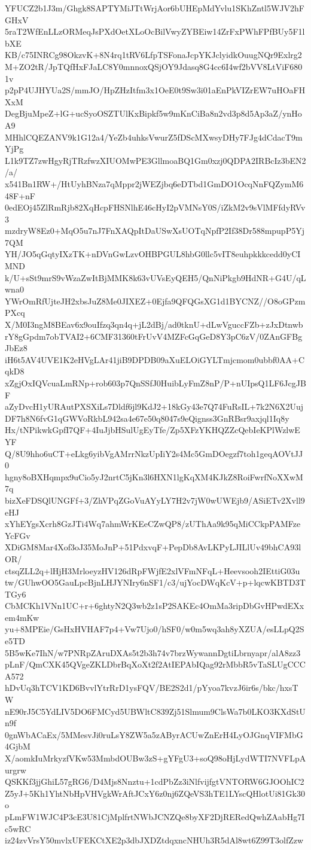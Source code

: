 YFUCZ2b1J3m/Ghgk8SAPTYMiJTtWrjAor6bUHEpMdYvlu1SKhZntl5WJV2hFGHxV
5raT2WfEnLLzORMeqJsPXdOetXLoOcBilVwyZYBEiw14ZrFxPWhFPfBUy5F1lbXE
KB/c75INRCg98OkzvK+8N4rq1tRV6LfpTSFonaJcpYKJclyidkOuugNQr9Exlrg2
M+ZO2tR/JpTQfHxFJaLC8Y0mnnoxQSjOY9Jdasq8G4cc6I4wf2bVV8LtViF6801v
p2pP4UJHYUa2S/mmJO/HpZHzItfm3x1OeE0t9Sw3i01aEnPkVIZrEW7uHOaFHXxM
DegBjuMpeZ+lG+ucSyoOSZTUlKxBipkf5w9mKnCiBa8n2vd3p8d5Ap3aZ/ynHoA9
MHhlCQEZANV9k1G12a4/YeZb4uhksVwurZ5fDScMXwsyDHy7FJg4dCdacT9mYjPg
L1k9TZ7zwHgyRjTRzfwzXIUOMwPE3GllmoaBQ1Gm0xzj0QDPA2IRBcIz3bEN2/a/
x541Bn1RW+/HtUyhBNza7qMppr2jWEZjbq6eDTbd1GmDO1OcqNnFQZymM648F+nF
0edEOj45ZlRmRjb82XqHcpFHSNlhE46cHyI2pVMNsY0S/iZkM2v9sVlMFfdyRVv3
mzdryW8Ez0+MqO5u7nJ7FnXAQpItDaUSwXsUOTqNpfP2If38Dr588mpupP5Yj7QM
YH/JO5qGqtyIXzTK+nDVnGwLzvOHBPGUL8hbG0llc5vIT8euhpkkkcedd0yCIMND
k/U+sSt9mrS9vWzaZwItBjMMK8k63vUVsEyQEH5/QnNiPkgb9HdNR+G4U/qLwna0
YWrOmRfUjteJH2xbsJuZ8Me0JIXEZ+0Ejfa9QFQGsXG1d1BYCNZ//O8oGPzmPXcq
X/M0I3ngM8BEav6x9ouIfzq3qn4q+jL2dBj/ad0tknU+dLwVguccFZb+zJxDtnwb
rY8gGpdm7obTVAI2+6CMF31360tFrUvV4MZFcGqGeD8Y3pC6zV/0ZAnGFBgJbEz8
iH6t5AV4UVE1K2eHVgLAr41jiB9DPDB09aXuELOiGYLTmjcmom0ubbf0AA+CqkD8
xZgjOxIQVcuaLmRNp+rob603p7QnSSfJ0HuibLyFmZ8nP/P+nUIpsQ1LF6JcgJBF
aZyDvcH1yURAutPXSXiLs7Dldf6jl9KdJ2+18kGy43e7Q74FuRsIL+7k2N6X2Uuj
DF7h8N6fvG1qGWVoRkbL942sa4e67e50q8047s9eQignss3GnRBsr9axjql1Iq8y
Hx/tNPikwkGpfI7QF+4IuJjbHSulUgEyTfe/Zp5XFzYKHQZZcQebIeKPlWzlwEYF
Q/8U9hho6uCT+eLkg6yibVgAMrrNkzUpIiY2s4Mc5GmDOegzf7toh1geqAOVtJJ0
hgny8oBXHqmpx9uCio5yJ2nrtC5jKn3l6HXN1lgKqXM4KJkZ8RoiFwrfNoXXwM7q
bizXeFDSQlUNGFf+3/ZhVPqZGoVuAYyLY7H2v7jW0wUWEjb9/ASiETv2Xvll9eHJ
xYhEYgsXcrh8GzJTi4Wq7ahmWrKEeCZwQP8/zUThAa9k95qMiCCkpPAMFzeYcFGv
XDiGM8Mar4Xof3oJ35MoJnP+51PdxvqF+PepDb8AvLKPyLJILlUv49bhCA93lOR/
ctsqZLL2q+lHjH3MrloeyzHV126dRpFWjfE2xlVFmNFqL+Heevsooh2IEttiG03u
tw/GUhwOO5GauLpcBjnLHJYNIry6nSF1/c3/ujYocDWqKcV+p+lqcwKBTD3TTGy6
CbMCKh1VNn1UC+r+6ghtyN2Q3wb2z1sP2SAKEc4OmMa3ripDbGvHPwdEXxem4mKw
yu+8MPEie/GsHxHVHAF7p4+Vw7Ujo0/hSF0/w0m5wq3ah8yXZUA/esLLpQ2Se5TD
5B5wKe7IhN/w7PNRpZAruDXAs5t2b3h74v7brzWywannDgtiLbrnyapr/alA8zz3
pLnF/QmCXK45QVgeZKLDbrBqXoXt2f2AtIEPAbIQag92rMbbR5vTaSLUgCCCA572
hDvUq3hTCV1KD6BvvlYtrRrD1ysFQV/BE2S2d1/pYyoa7kvzJ6ir6s/bkc/hxsTW
nE90rJ5C5YdLIV5DO6FMCyd5UBWltC839Zj51Slmum9ClsWa7b0LKO3KXdStUn9f
0gnWbACaEx/5MMesvJi0ruLsY8ZW5a5zAByrACUwZnErH4LyOJGnqVIFMbG4GjbM
X/aomkIuMrkyzfVKw53MmbdOUBw3zS+gYFgU3+soQ98oHjLydWTI7NVFLpAurgrw
QSKKf3jjGhiL57gRG6/D4Mjs8Nnztu+1cdPbZz3iNlfvijfgtVNTORW6GJOOhIC2
Z5yJ+5Kh1YhtNbHpVHVgkWrAftJCxY6z0nj6ZQeVS3hTE1LYscQHlotUi81Gk30o
pLmFW1WJC4P3cE3U81CjMplfrtNWbJCNZQe8byXF2DjRERedQwhZAabHg7Ic5wRC
iz24zvVrsY50mvlxUFEKCtXE2p3dbJXDZtdqxncNHUh3R5dAl8wt6Z99T3olfZzw
